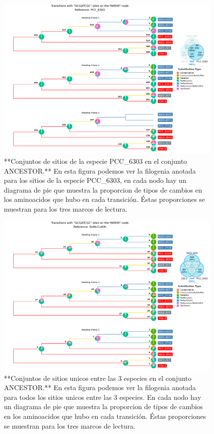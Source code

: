 \documentclass[
]{book}
\begin{document}
\begin{figure}

{\centering \includegraphics[width=1.2\linewidth]{Clados/Calothrix_B/figures/A/GCGATCGC/Ancestor/PCC_6303_Ancestral_A_tree} 

}

\caption{**Conjuntos de sitios de la especie PCC\_6303 en el conjunto ANCESTOR.** En esta figura podemos ver la filogenia anotada para los sitios de la especie PCC\_6303, en cada nodo hay un diagrama de pie que muestra la proporcion de tipos de cambios en los aminoacidos que hubo en cada transición. Éstas proporciones se muestran para los tres marcos de lectura.}\label{fig:FIG7}
\end{figure}

\begin{figure}

{\centering \includegraphics[width=1.2\linewidth]{Clados/Calothrix_B/figures/A/GCGATCGC/Ancestor/SUBCLADE_Ancestor_A_tree} 

}

\caption{**Conjuntos de sitios unicos entre las 3 especies en el conjunto ANCESTOR.** En esta figura podemos ver la filogenia anotada para todos los sitios unicos entre las 3 especies. En cada nodo hay un diagrama de pie que muestra la proporcion de tipos de cambios en los aminoacidos que hubo en cada transición. Éstas proporciones se muestran para los tres marcos de lectura.}\label{fig:FIG8}
\end{figure}
\end{document}
